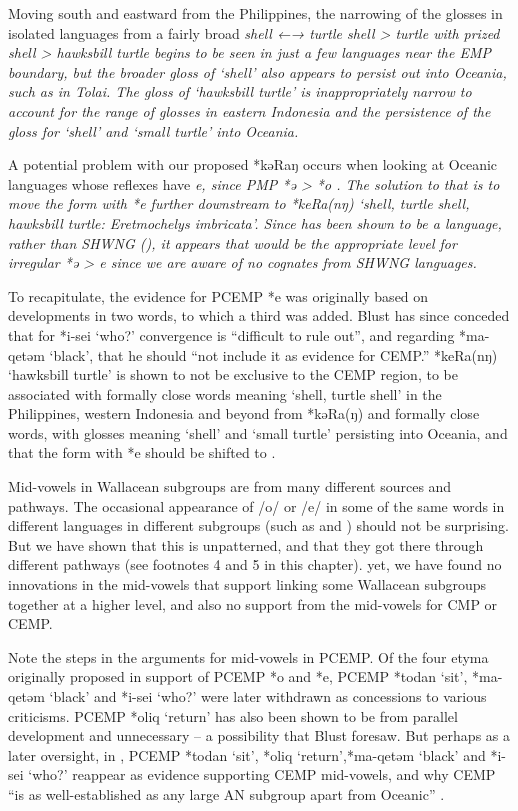 Moving south and eastward from the Philippines,
the narrowing of the glosses in isolated languages from a fairly
broad \it{shell} ←→ \it{turtle shell > turtle with prized shell
> hawksbill turtle} begins to be seen in just a few languages
near the EMP boundary,
but the broader gloss of ‘shell’ also appears to persist out
into Oceania, such as in Tolai.
The gloss of ‘hawksbill turtle’ is inappropriately narrow to
account for the range of glosses in eastern Indonesia
and the persistence of the gloss for ‘shell’
and ‘small turtle’ into Oceania.

A potential problem with our proposed *kəRaŋ occurs when looking
at Oceanic languages whose reflexes have \it{e},
since PMP *ə >  *o \citep{Ross1998}.
The solution to that is to move the form with *e further downstream
to  *keRa(nŋ) ‘shell,
turtle shell, hawksbill turtle: \it{Eretmochelys imbricata}’.
Since  has been shown to be a 
language, rather than SHWNG (),
it appears that  would be the appropriate level for
irregular *ə > \it{e} since we are aware of no cognates from SHWNG languages.

To recapitulate, the evidence for PCEMP *e was originally based
on developments in two words,
to which a third was added.
Blust has since conceded that for *i-sei ‘who?’ convergence is
“difficult to rule out”,
and regarding *ma-qetəm ‘black’,
that he should “not include it as evidence for CEMP.” *keRa(nŋ)
‘hawksbill turtle’ is shown to not be exclusive to the CEMP region,
to be associated with formally close words meaning ‘shell,
turtle shell’ in the Philippines,
western Indonesia and beyond from *kəRa(ŋ)
and formally close words,
with glosses meaning ‘shell’
and ‘small turtle’ persisting into Oceania,
and that the form with *e should be shifted to .

Mid-vowels in Wallacean subgroups are from many different sources and pathways.
The occasional appearance of /o/ or /e/ in some of the same words
in different languages in different subgroups (such as 
and ) should not be surprising.
But we have shown that this is unpatterned,
and that they got there through different pathways (see footnotes
4 and 5 in this chapter).
 yet, we have found no innovations in the mid-vowels that support
linking some Wallacean subgroups together at a higher level,
and also no support from the mid-vowels for CMP or CEMP.

Note the steps in the arguments for mid-vowels in PCEMP.
Of the four etyma originally proposed \citep{Blust1993} in support
of PCEMP *o and *e, PCEMP *todan ‘sit’, *ma-qetəm ‘black’
and *i-sei ‘who?’ were later withdrawn \citep{Blust2009} as concessions to various criticisms.
PCEMP *oliq ‘return’ has also been shown to be from parallel
development and unnecessary -- a possibility that Blust foresaw.
But perhaps as a later oversight,
in \citet[740]{Blust2013}, PCEMP *todan ‘sit’, *oliq ‘return’,*ma-qetəm
‘black’ and *i-sei ‘who?’ reappear as evidence supporting CEMP mid-vowels,
and why CEMP “is as well-established as any large AN subgroup
apart from Oceanic” \citep[740]{Blust2013}.

